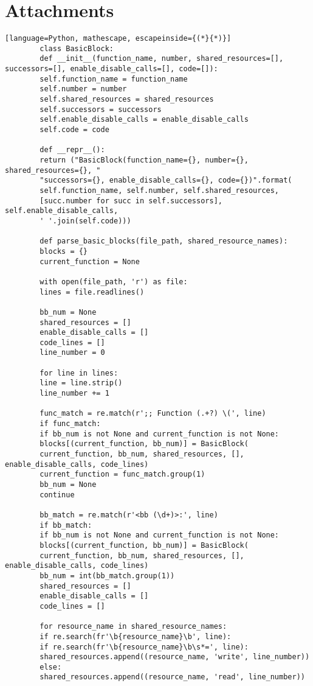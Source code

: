 \documentclass[
fancyheadings, %
%
%
]{stsreprt}
\begin{document}
	\chapter{Attachments}
	\begin{lstlisting}[language=Python, mathescape, escapeinside={(*}{*)}]
		class BasicBlock:
		def __init__(function_name, number, shared_resources=[], successors=[], enable_disable_calls=[], code=[]):
		self.function_name = function_name
		self.number = number
		self.shared_resources = shared_resources
		self.successors = successors
		self.enable_disable_calls = enable_disable_calls
		self.code = code
		
		def __repr__():
		return ("BasicBlock(function_name={}, number={}, shared_resources={}, "
		"successors={}, enable_disable_calls={}, code={})".format(
		self.function_name, self.number, self.shared_resources, 
		[succ.number for succ in self.successors], self.enable_disable_calls, 
		' '.join(self.code)))
		
		def parse_basic_blocks(file_path, shared_resource_names):
		blocks = {}
		current_function = None
		
		with open(file_path, 'r') as file:
		lines = file.readlines()
		
		bb_num = None
		shared_resources = []
		enable_disable_calls = []
		code_lines = []
		line_number = 0  
		
		for line in lines:
		line = line.strip()
		line_number += 1
		
		func_match = re.match(r';; Function (.+?) \(', line)
		if func_match:
		if bb_num is not None and current_function is not None:
		blocks[(current_function, bb_num)] = BasicBlock(
		current_function, bb_num, shared_resources, [], enable_disable_calls, code_lines)
		current_function = func_match.group(1)
		bb_num = None
		continue
		
		bb_match = re.match(r'<bb (\d+)>:', line)
		if bb_match:
		if bb_num is not None and current_function is not None:
		blocks[(current_function, bb_num)] = BasicBlock(
		current_function, bb_num, shared_resources, [], enable_disable_calls, code_lines)
		bb_num = int(bb_match.group(1))
		shared_resources = []
		enable_disable_calls = []
		code_lines = []
		
		for resource_name in shared_resource_names:
		if re.search(fr'\b{resource_name}\b', line):
		if re.search(fr'\b{resource_name}\b\s*=', line):
		shared_resources.append((resource_name, 'write', line_number))
		else:
		shared_resources.append((resource_name, 'read', line_number))
		

\end{lstlisting}
\end{document}
